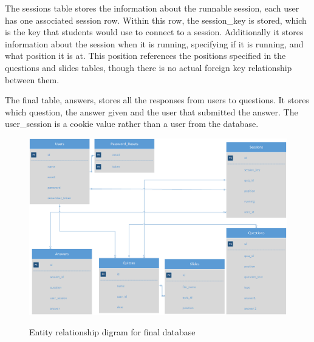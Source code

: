 The sessions table stores the information about the runnable session, each user has one associated session row. Within this row, the session\_key is stored, which is the key that students would use to connect to a session. Additionally it stores information about the session when it is running, specifying if it is running, and what position it is at. This position references the positions specified in the questions and slides tables, though there is no actual foreign key relationship between them. 

The final table, answers, stores all the responses from users to questions. It stores which question, the answer given and the user that submitted the answer. The user\_session is a cookie value rather than a user from the database.

\begin{figure}
	\caption{Entity relationship digram for final database}
	\includegraphics[width=\textwidth]{Chapter3/Final-ER-Image}
	\label{fig:er-diagram}
\end{figure}
